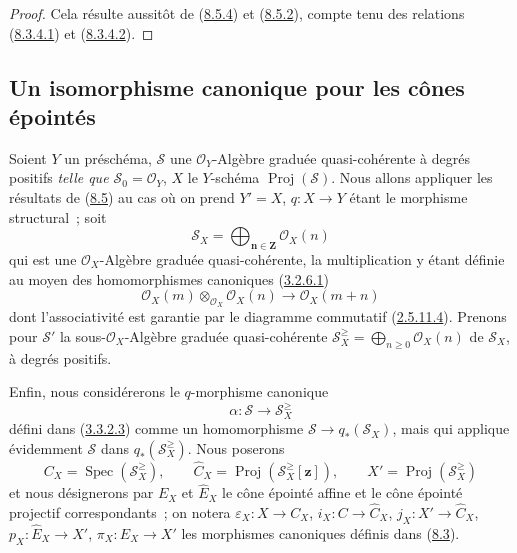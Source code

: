 \begin{proof}
Cela résulte aussitôt de (\hyperref[II.8.5.4-fr]{8.5.4}) et
(\hyperref[II.8.5.2-fr]{8.5.2}), compte tenu des relations
(\hyperref[II.8.3.4.1-fr]{8.3.4.1}) et
(\hyperref[II.8.3.4.2-fr]{8.3.4.2}).
\end{proof}

\subsection{Un isomorphisme canonique pour les cônes épointés}
\label{subsection:II.8.6-fr}

\begin{env}[8.6.1]
\label{II.8.6.1-fr}
Soient $Y$ un préschéma, $\mathcal{S}$ une $\mathcal{O}_Y$-Algèbre graduée
quasi-cohérente à degrés positifs \emph{telle que
$\mathcal{S}_0=\mathcal{O}_Y$}, $X$ le $Y$-schéma
$\operatorname{Proj}(\mathcal{S})$. Nous allons appliquer les résultats de
(\hyperref[subsection:II.8.5-fr]{8.5}) au cas où on prend $Y'=X$,
$q:X\to Y$ étant le morphisme structural~; soit
\begin{equation}
\label{II.8.6.1.1-fr}
  \mathcal{S}_X=\bigoplus_{\boldsymbol{n}\in\mathbf{Z}}\mathcal{O}_X(n)
\tag{8.6.1.1}
\end{equation}
qui est une $\mathcal{O}_X$-Algèbre graduée quasi-cohérente, la multiplication
y étant définie au moyen des homomorphismes canoniques
(\hyperref[II.3.2.6.1-fr]{3.2.6.1})
\[
  \mathcal{O}_X(m)\otimes_{\mathcal{O}_X}\mathcal{O}_X(n)
  \to\mathcal{O}_X(m+n)
\]
dont l'associativité est garantie par le diagramme commutatif
(\hyperref[II.2.5.11.4-fr]{2.5.11.4}). Prenons pour $\mathcal{S}'$ la
sous-$\mathcal{O}_X$-Algèbre graduée quasi-cohérente
$\mathcal{S}_X^{\geq}=\bigoplus_{n\geq0}\mathcal{O}_X(n)$ de
$\mathcal{S}_X$, à degrés positifs.

Enfin, nous considérerons le $q$-morphisme canonique
\begin{equation}
\label{II.8.6.1.2-fr}
  \alpha:\mathcal{S}\to\mathcal{S}_X^{\geq}
\tag{8.6.1.2}
\end{equation}
défini dans (\hyperref[II.3.3.2.3-fr]{3.3.2.3}) comme un homomorphisme
$\mathcal{S}\to q_*(\mathcal{S}_X)$, mais qui applique évidemment
$\mathcal{S}$ dans $q_*(\mathcal{S}_X^{\geq})$. Nous poserons
\begin{equation}
\label{II.8.6.1.3-fr}
  C_X=\operatorname{Spec}(\mathcal{S}_X^{\geq}),\qquad
  \widehat{C}_X=\operatorname{Proj}(\mathcal{S}_X^{\geq}[\mathbf{z}]),\qquad
  X'=\operatorname{Proj}(\mathcal{S}_X^{\geq})
\tag{8.6.1.3}
\end{equation}
et nous désignerons par $E_X$ et $\widehat{E}_X$ le cône épointé affine et le
cône épointé projectif correspondants~; on notera
$\varepsilon_X:X\to C_X$, $i_X:C\to\widehat{C}_X$,
$j_X:X'\to\widehat{C}_X$, $p_X:\widehat{E}_X\to X'$,
$\pi_X:E_X\to X'$ les morphismes canoniques définis dans
(\hyperref[subsection:II.8.3-fr]{8.3}).
\end{env}

